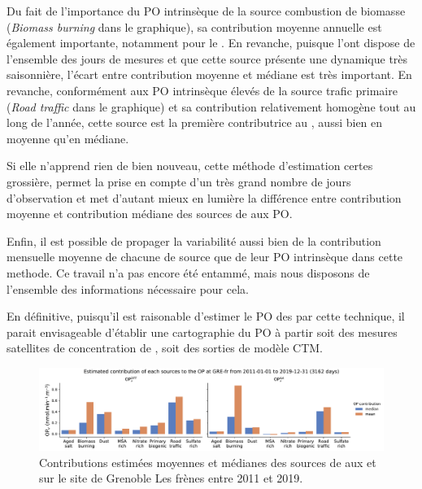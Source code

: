Du fait de l'importance du PO intrinsèque de la source combustion de biomasse
(\textit{Biomass burning} dans le graphique), sa contribution moyenne annuelle est
également importante, notamment pour le \POAAv.  En revanche, puisque l'ont dispose de
l'ensemble des jours de mesures et que cette source présente une dynamique très
saisonnière, l'écart entre contribution moyenne et médiane est très important.
En revanche, conformément aux PO intrinsèque élevés de la source trafic primaire
(\textit{Road traffic} dans le graphique) et sa contribution relativement homogène tout au
long de l'année, cette source est la première contributrice au \PODTTv, aussi bien en
moyenne qu'en médiane.

Si elle n'apprend rien de bien nouveau, cette méthode d'estimation certes grossière,
permet la prise en compte d'un très grand nombre de jours d'observation et met d'autant
mieux en lumière la différence entre contribution moyenne et contribution médiane des
sources de \PMdix{} aux PO.

Enfin, il est possible de propager la variabilité aussi bien de la contribution mensuelle
moyenne de chacune de source que de leur PO intrinsèque dans cette methode. Ce travail n'a
pas encore été entammé, mais nous disposons de l'ensemble des informations nécessaire pour
cela.

En définitive, puisqu'il est raisonable d'estimer le PO des \PMdix{} par cette technique,
il parait envisageable d'établir une cartographie du PO à partir soit des mesures satellites
de concentration de \PMdix, soit des sorties de modèle CTM.

\begin{figure}[ht]
    \centering
    \includegraphics[width=1.0\linewidth]{figures/chapter05/OPGRE-fr_source_estimated.pdf}
    \caption{Contributions estimées moyennes et médianes des sources de \PMdix{} aux
        \PODTTv{} et \POAAv{} sur le site de Grenoble Les frènes entre 2011 et 2019.}%
    \label{fig:OPGRE-fr_source_estimated}
\end{figure}

